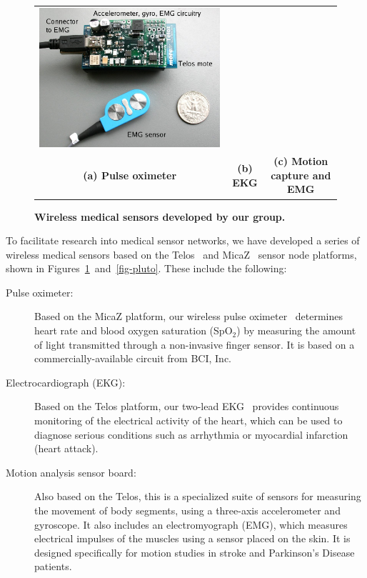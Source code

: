 \begin{figure}[t]
\begin{center}
\begin{tabular}{ccc}
\includegraphics[height=0.18\vsize]{./resources/codeblue-nsdi06/figures/pics/mercury1-annotate-nourl.jpg} \\
{\small\bf (a) Pulse oximeter} & {\small\bf (b) EKG} & {\small\bf (c)
Motion capture and EMG}
\end{tabular}
\end{center}
\caption{{\small {\bf Wireless medical sensors developed by our
group.}}}
\label{fig-sensors}
\end{figure}
To facilitate research into medical sensor networks, 
we have developed a series of wireless medical sensors based
on the Telos~\cite{telos} and MicaZ~\cite{micaz} sensor node
platforms, shown in Figures~\ref{fig-sensors}~and~\ref{fig-pluto}. 
These include the
following:
\begin{description}
\item[Pulse oximeter:] Based on the MicaZ platform, our wireless
pulse oximeter~\cite{codeblue-wames} determines heart rate and blood oxygen 
saturation (SpO$_2$) by measuring the amount of light transmitted through 
a non-invasive finger sensor. It is based on a commercially-available
circuit from BCI, Inc.
\item[Electrocardiograph (EKG):] Based on the Telos platform, our
two-lead EKG~\cite{vitalekg} provides continuous monitoring of the 
electrical activity of the heart, which can be used to diagnose
serious conditions such as arrhythmia or myocardial infarction (heart attack). 
\item[Motion analysis sensor board:] Also based on the Telos, 
this is a specialized suite of sensors for measuring the movement of
body segments, using a three-axis accelerometer and gyroscope. It also
includes an electromyograph (EMG), which measures electrical
impulses of the muscles using a sensor placed on the skin.
It is designed specifically for motion studies in stroke and
Parkinson's Disease patients.
\end{description}


